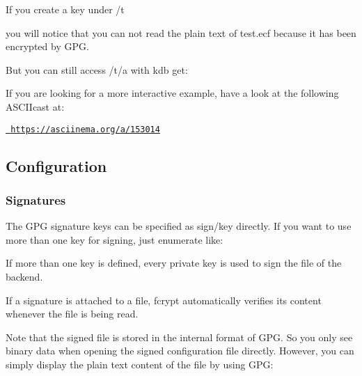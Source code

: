 If you create a key under {\ttfamily /t}


\begin{DoxyCode}{0}
\end{DoxyCode}


you will notice that you can not read the plain text of {\ttfamily test.\+ecf} because it has been encrypted by G\+PG.

But you can still access {\ttfamily /t/a} with {\ttfamily kdb get}\+:


\begin{DoxyCode}{0}
\end{DoxyCode}


If you are looking for a more interactive example, have a look at the following A\+S\+C\+I\+Icast at\+:

\href{https://asciinema.org/a/153014}{\texttt{ https\+://asciinema.\+org/a/153014}}\hypertarget{autotoc_md207_autotoc_md216}{}\subsection{Configuration}\label{autotoc_md207_autotoc_md216}
\hypertarget{autotoc_md207_autotoc_md217}{}\subsubsection{Signatures}\label{autotoc_md207_autotoc_md217}
The G\+PG signature keys can be specified as {\ttfamily sign/key} directly. If you want to use more than one key for signing, just enumerate like\+:


\begin{DoxyCode}{0}
\end{DoxyCode}


If more than one key is defined, every private key is used to sign the file of the backend.

If a signature is attached to a file, {\ttfamily fcrypt} automatically verifies its content whenever the file is being read.

Note that the signed file is stored in the internal format of G\+PG. So you only see binary data when opening the signed configuration file directly. However, you can simply display the plain text content of the file by using G\+PG\+:


